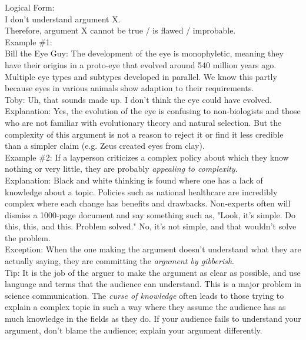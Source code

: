 \documentclass[a4paper,12pt,single,pdftex]{scrartcl}
\begin{document}
    
      Logical Form:
    \\

    
      I don't understand argument X.
    \\

    
      Therefore, argument X cannot be true / is flawed / improbable.
    \\

    
      Example \#1:
    \\

    
      Bill the Eye Guy: The development of the eye is monophyletic, meaning they have their origins in a proto-eye that evolved around 540 million years ago. Multiple eye types and subtypes developed in parallel. We know this partly because eyes in various animals show adaption to their requirements.
    \\

    
      Toby: Uh, that sounds made up. I don't think the eye could have evolved.
    \\

    
      Explanation: Yes, the evolution of the eye is confusing to non-biologists and those who are not familiar with evolutionary theory and natural selection. But the complexity of this argument is not a reason to reject it or find it less credible than a simpler claim (e.g. Zeus created eyes from clay).
    \\

    
      Example \#2: If a layperson criticizes a complex policy about which they know nothing or very little, they are probably {\it appealing to complexity}.
    \\

    
      Explanation: Black and white thinking is found where one has a lack of knowledge about a topic. Policies such as national healthcare are incredibly complex where each change has benefits and drawbacks. Non-experts often will dismiss a 1000-page document and say something such as, "Look, it's simple. Do this, this, and this. Problem solved." No, it's not simple, and that wouldn't solve the problem.
    \\

    
      Exception: When the one making the argument doesn't understand what they are actually saying, they are committing the {\it argument by gibberish}.
    \\

    
      Tip: It is the job of the arguer to make the argument as clear as possible, and use language and terms that the audience can understand. This is a major problem in science communication. The {\it curse of knowledge} often leads to those trying to explain a complex topic in such a way where they assume the audience has as much knowledge in the fields as they do. If your audience fails to understand your argument, don't blame the audience;  explain your argument differently.
    \\
\end{document}
